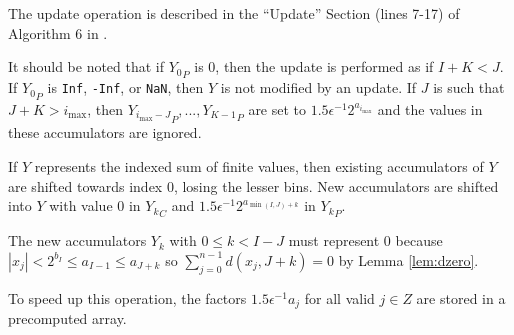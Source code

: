     The update operation is described in the ``Update'' Section (lines 7-17) of Algorithm $6$ in \cite{repsum}.

    It should be noted that if ${Y_0}_P$ is 0, then the update is performed as
    if $I + K < J$. If ${Y_0}_P$ is \texttt{Inf}, \texttt{-Inf}, or
    \texttt{NaN}, then $Y$ is not modified by an update.
    If $J$ is such that $J + K > i_{\max}$, then
    ${Y_{i_{\max} - J}}_P, ...,  {Y_{K - 1}}_P$ are set to $1.5
    \epsilon^{-1}2^{a_{i_{\max}}}$ and the values in these accumulators are
    ignored.

    If $Y$ represents the indexed sum of finite values, then existing accumulators of $Y$ are shifted towards index $0$, losing the lesser bins. New accumulators are shifted into $Y$ with value $0$ in ${Y_k}_C$ and $1.5  \epsilon^{-1}  2^{a_{\min(I, J) + k}}$ in ${Y_k}_P$.

    The new accumulators $Y_k$ with $0 \leq k < I - J$ must represent 0 because
    $|x_j| < 2^{b_I} \leq a_{I - 1} \leq a_{J + k}$ so
    \(
      \sum\limits_{j = 0}^{n - 1} d(x_j, J + k) = 0
    \) by Lemma \ref{lem:dzero}.

    To speed up this operation, the factors $1.5  \epsilon^{-1}  a_j$ for all
    valid $j \in Z$ are stored in a precomputed array.

